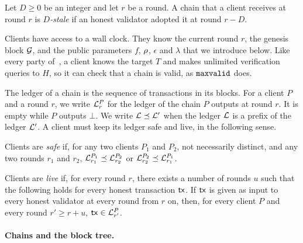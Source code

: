 \begin{definition}\label{def.stale}
    Let $D\ge0$ be an integer and let $r$ be a round. A chain that a client
    receives at round $r$ is \emph{$D$-stale} if an honest validator adopted it
    at round $r-D$.
\end{definition}

Clients have access to a wall clock. They know the current round $r$, the
genesis block $\mathcal{G}$, and the public parameters $f$, $\rho$, $\epsilon$ and
$\lambda$ that we introduce below. Like every party of~\cite{gkl24}, a client
knows the target $T$ and makes unlimited verification queries to $H$, so it can
check that a chain is valid, as $\mathtt{maxvalid}$ does.

The ledger of a chain is the sequence of transactions in its blocks. For a
client $P$ and a round $r$, we write $\mathcal{L}^P_r$ for the ledger of the chain
$P$ outputs at round $r$. It is empty while $P$ outputs $\bot$. We write
$\mathcal{L}\preceq\mathcal{L}'$ when the ledger $\mathcal{L}$ is a prefix of the ledger
$\mathcal{L}'$. A client must keep its ledger safe and live, in the following
sense.

\begin{definition}\label{def.safety}
    Clients are \emph{safe} if, for any two clients $P_1$ and $P_2$, not
    necessarily distinct, and any two rounds $r_1$ and $r_2$,
    $\mathcal{L}^{P_1}_{r_1}\preceq\mathcal{L}^{P_2}_{r_2}$ or
    $\mathcal{L}^{P_2}_{r_2}\preceq\mathcal{L}^{P_1}_{r_1}$.
\end{definition}

\begin{definition}\label{def.liveness}
    Clients are \emph{live} if, for every round $r$, there exists a number of
    rounds $u$ such that the following holds for every honest transaction
    $\mathsf{tx}$. If $\mathsf{tx}$ is given as input to every honest validator at every round
    from $r$ on, then, for every client $P$ and every round $r'\ge r+u$,
    $\mathsf{tx}\in\mathcal{L}^P_{r'}$.
\end{definition}

\paragraph{Chains and the block tree.}

